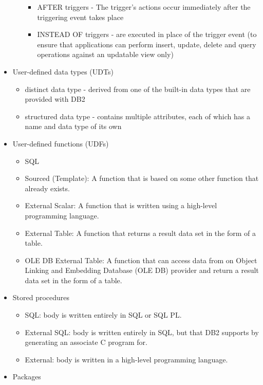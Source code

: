 \documentclass{article}
\begin{document}
\begin{itemize}
\begin{itemize}
\begin{itemize}
		\item AFTER triggers - The trigger's actions occur immediately after the triggering event takes
		place
		\item INSTEAD OF triggers - are executed in place of the trigger event (to ensure that 
		applications can perform insert, update, delete and query operations against an updatable
		view only)
		\end{itemize}
	\end{itemize}
\item User-defined data types (UDTs)
	\begin{itemize}
	\item distinct data type - derived from one of the built-in data types that are provided with DB2
	\item {\color{green} structured data type} - contains multiple attributes, each of which has a name
	and data type of its own
	\end{itemize}
\item User-defined functions (UDFs)
	\begin{itemize}
	\item SQL
	\item Sourced (Template): A function that is based on some other function that already exists.
	\item External Scalar: A function that is written using a high-level programming language.
	\item External Table: A function that returns a result data set in the form of a table.
	\item OLE DB External Table: A function that can access data from on Object Linking and 
	Embedding Database (OLE DB) provider and return a result data set in the form of a table.
	\end{itemize}
\item Stored procedures
	\begin{itemize}
	\item SQL: body is written entirely in SQL or SQL PL.
	\item {\color{red}External SQL}: body is written entirely in SQL, but that DB2 supports by generating 
	an associate C program for.
	\item External: body is written in a high-level programming language.
	\end{itemize}
\item Packages
\end{itemize}
\end{document}
